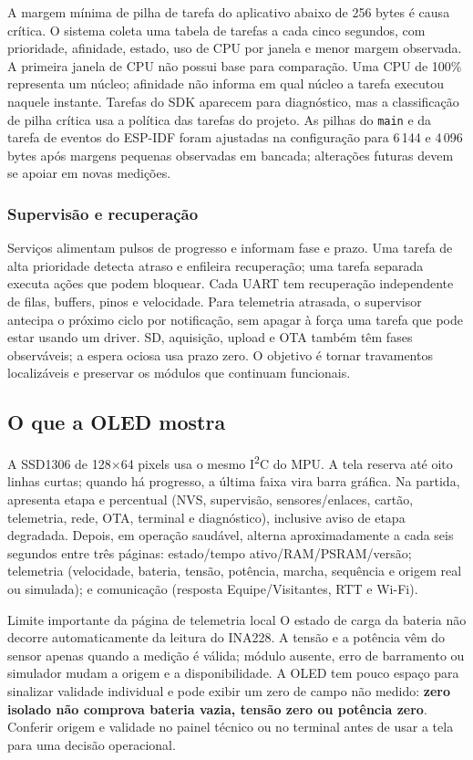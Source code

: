 A margem mínima de pilha de tarefa do aplicativo abaixo de 256 bytes é causa crítica. O sistema coleta uma tabela de tarefas a cada cinco segundos, com prioridade, afinidade, estado, uso de CPU por janela e menor margem observada. A primeira janela de CPU não possui base para comparação. Uma CPU de 100\% representa um núcleo; afinidade não informa em qual núcleo a tarefa executou naquele instante. Tarefas do SDK aparecem para diagnóstico, mas a classificação de pilha crítica usa a política das tarefas do projeto. As pilhas do \texttt{main} e da tarefa de eventos do ESP-IDF foram ajustadas na configuração para 6\,144 e 4\,096 bytes após margens pequenas observadas em bancada; alterações futuras devem se apoiar em novas medições.

\subsubsection{Supervisão e recuperação}
Serviços alimentam pulsos de progresso e informam fase e prazo. Uma tarefa de alta prioridade detecta atraso e enfileira recuperação; uma tarefa separada executa ações que podem bloquear. Cada UART tem recuperação independente de filas, buffers, pinos e velocidade. Para telemetria atrasada, o supervisor antecipa o próximo ciclo por notificação, sem apagar à força uma tarefa que pode estar usando um driver. SD, aquisição, upload e OTA também têm fases observáveis; a espera ociosa usa prazo zero. O objetivo é tornar travamentos localizáveis e preservar os módulos que continuam funcionais.

\subsection{O que a OLED mostra}
A SSD1306 de 128$\times$64 pixels usa o mesmo I\textsuperscript{2}C do MPU. A tela reserva até oito linhas curtas; quando há progresso, a última faixa vira barra gráfica. Na partida, apresenta etapa e percentual (NVS, supervisão, sensores/enlaces, cartão, telemetria, rede, OTA, terminal e diagnóstico), inclusive aviso de etapa degradada. Depois, em operação saudável, alterna aproximadamente a cada seis segundos entre três páginas: estado/tempo ativo/RAM/PSRAM/versão; telemetria (velocidade, bateria, tensão, potência, marcha, sequência e origem real ou simulada); e comunicação (resposta Equipe/Visitantes, RTT e Wi-Fi).

\begin{nota}{Limite importante da página de telemetria local}
O estado de carga da bateria não decorre automaticamente da leitura do INA228. A tensão e a potência vêm do sensor apenas quando a medição é válida; módulo ausente, erro de barramento ou simulador mudam a origem e a disponibilidade. A OLED tem pouco espaço para sinalizar validade individual e pode exibir um zero de campo não medido: \textbf{zero isolado não comprova bateria vazia, tensão zero ou potência zero}. Conferir origem e validade no painel técnico ou no terminal antes de usar a tela para uma decisão operacional.
\end{nota}


